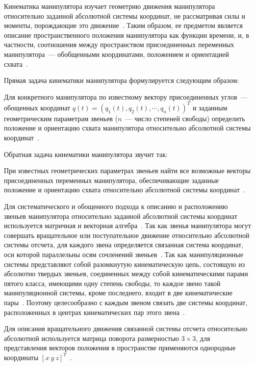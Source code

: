 \documentclass[oneside, final, 14pt]{extarticle}
\begin{document}
Кинематика манипулятора изучает геометрию движения манипулятора относительно заданной абсолютной системы координат, не рассматривая силы и моменты, порождающие это движение~\cite{fu:rob_tech}.
Таким образом, ее предметом является описание пространственного положения манипулятора как функции времени, и, в частности, соотношения между пространством присоединенных переменных манипулятора~--- обобщенными координатами, положением и ориентацией схвата~\cite{fu:rob_tech}.
\par
Прямая задача кинематики манипулятора формулируется следующим образом:
\par
Для конкретного манипулятора по известному вектору присоединенных углов~--- обощенных координат \(q(t) = (q_1(t),q_2(t), \cdots, q_n(t))^T\) и заданным геометрическим параметрам звеньев (\(n\)~--- число степеней свободы) определить положение и ориентацию схвата манипулятора относительно абсолютной системы координат~\cite{fu:rob_tech}.
\par
Обратная задача кинематики манипулятора звучит так:
\par
При известных геометрических параметрах звеньев найти все возможные векторы присоединенных переменных манипулятора, обеспечивающие заданные положение и ориентацию схвата относительно абсолютной системы координат~\cite{fu:rob_tech}.
\par
Для систематического и обощенного подхода к описанию и расположению звеньев манипулятора относительно заданной абсолютной системы координат используется матричная и векторная алгебра~\cite{fu:rob_tech, shahinpur:rob_tech}.
Так как звенья манипулятора могут совершать вращательное или поступательное движение относительно абсолютной системы отсчета, для каждого звена определяется связанная система координат, оси которой параллельны осям сочленений звеньев~\cite{fu:rob_tech}.
Так как манипуляционные системы представляют собой разомкнутую кинематическую цепь, состоящую из абсолютно твердых звеньев, соединенных между собой кинематическими парами пятого класса, имеющими одну степень свободы, то каждое звено такой манипуляционной системы, кроме последнего, входит в две кинематические пары~\cite{krahmalev:mod_rob}.
Поэтому целесообразно с каждым звеном связать две системы координат, расположенных в центрах кинематических пар этого звена~\cite{krahmalev:mod_rob}.
\par
Для описания вращательного движения связанной системы отсчета относительно абсолютной используется матрица поворота размерностью \(3 \times 3\), для представления векторов положения в пространстве применяются однородные координаты \( [x\:y\:z]^T\)~\cite{fu:rob_tech, shahinpur:rob_tech}.
\end{document}
